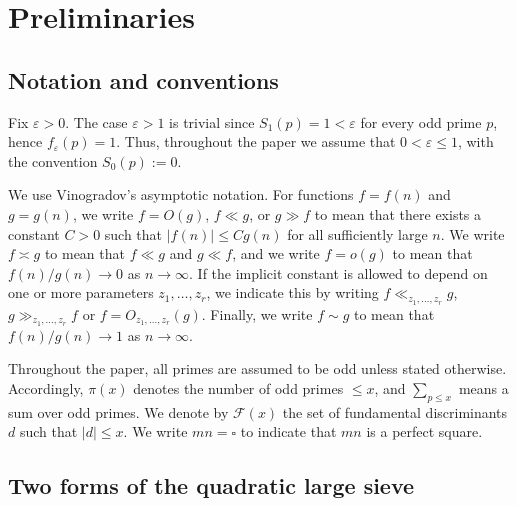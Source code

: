 \documentclass[11pt,letterpaper,reqno]{amsart}
\theoremstyle{definition}
\numberwithin{equation}{section}
\newcommand{\Leg}[2]{\left(\frac{#1}{#2}\right)}
\newcommand{\1}{\mathbf{1}}
\begin{document}
\section{Preliminaries}\label{sec:Preliminaries}

\subsection{Notation and conventions}

Fix $\varepsilon>0$. The case $\varepsilon > 1$ is trivial since $S_1(p)=1<\varepsilon$ for every odd prime
$p$, hence $f_\varepsilon(p)=1$. Thus, throughout the paper we assume that $0<\varepsilon \leq 1$, with the convention $S_0(p):=0$.


We use Vinogradov's asymptotic notation. For functions \(f=f(n)\) and \(g=g(n)\), we write
\(f=O(g)\), \(f\ll g\), or \(g\gg f\) to mean that there exists a constant \(C>0\) such that
\(|f(n)|\le C g(n)\) for all sufficiently large \(n\).
We write \(f\asymp g\) to mean that \(f\ll g\) and \(g\ll f\), and we write
\(f=o(g)\) to mean that \(f(n)/g(n)\to 0\) as \(n\to\infty\).
If the implicit constant is allowed to depend on one or more parameters $z_1,\dots,z_r$, we indicate this by
writing $f\ll_{z_1,\dots,z_r} g$, $g\gg_{z_1,\dots,z_r} f$ or $f=O_{z_1,\dots,z_r}(g)$.
Finally, we write $f\sim g$ to mean that $f(n)/g(n)\to 1$ as $n\to\infty$.

Throughout the paper, all primes are assumed to be odd unless stated otherwise.
Accordingly, $\pi(x)$ denotes the number of odd primes $\le x$, and $\sum_{p\le x}$ means a sum over odd primes. We denote by $\mathcal{F}(x)$ the set of fundamental discriminants $d$ such that $|d|\le x$. We write $mn=\square$ to indicate that $mn$ is a perfect square. 


\subsection{Two forms of the quadratic large sieve}
\end{document}
